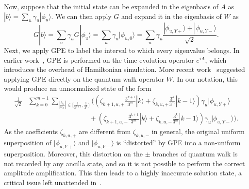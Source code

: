 \documentclass[letterpaper,onecolumn,11pt,accepted=2026-02-14]{quantumarticle}
\newcommand{\abs}[1]{\left\lvert#1\right\rvert}
\theoremstyle{remark}
\theoremstyle{plain}
\newcommand{\ket}[1]{|#1\rangle}
\begin{document}
Now, suppose that the initial state can be expanded in the eigenbasis of $A$ as $\ket{b}=\sum_u\gamma_u\ket{\phi_u}$. We can then apply $G$ and expand it in the eigenbasis of $W$ as
\begin{equation}
    G\ket{b}=\sum_u\gamma_uG\ket{\phi_u}
    =\sum_u\gamma_u\ket{\phi_{u,0}}
    =\sum_u\gamma_u\frac{\ket{\phi_{u,Y+}}+\ket{\phi_{u,Y-}}}{\sqrt{2}}.
\end{equation}
Next, we apply GPE to label the interval to which every eigenvalue belongs. In earlier work~\cite{Childs2015LinearSystems}, GPE is performed on the time evolution operator $e^{iA}$, which introduces the overhead of Hamiltonian simulation. More recent work~\cite{Chakraborty2023VTAAQLSP} suggested applying GPE directly on the quantum walk operator $W$.  In our notation, this would produce an unnormalized state of the form
\begin{equation}
\label{eq:gpe_no_bm}
\begin{aligned}
    \frac{1}{\sqrt{2}}&\sum_{k=0}^{m-1}\sum_{\abs{\frac{\lambda_u}{\alpha_A}}\in\big[\frac{1}{3^{k+1}},\frac{1}{3^k}\big)}
    \Bigg(\left(\zeta_{k+1,u,+}\frac{3^{k+1}}{3^m}\ket{k}+\zeta_{k,u,+}\frac{3^k}{3^m}\ket{k-1}\right)\gamma_u\ket{\phi_{u,Y+}}\\
    &\qquad\qquad\qquad\qquad\quad+\left(\zeta_{k+1,u,-}\frac{3^{k+1}}{3^m}\ket{k}+\zeta_{k,u,-}\frac{3^k}{3^m}\ket{k-1}\right)\gamma_u\ket{\phi_{u,Y-}}\Bigg).
\end{aligned}
\end{equation}
As the coefficients $\zeta_{k,u,+}$  are different from $\zeta_{k,u,-}$ in general, the original uniform superposition of $\ket{\phi_{u,Y+}}$ and $\ket{\phi_{u,Y-}}$ is ``distorted'' by GPE into a non-uniform superposition. Moreover, this distortion on the $\pm$ branches of quantum walk is not recorded by any ancilla state, and so it is not possible to perform the correct amplitude amplification. This then leads to a highly inaccurate solution state, a critical issue left unattended in~\cite{Chakraborty2023VTAAQLSP}.
\end{document}
